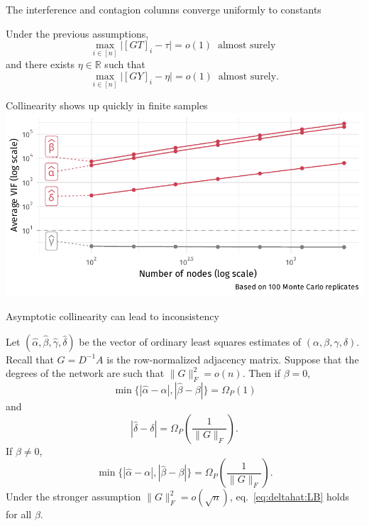 \documentclass[aspectratio=169]{beamer}
\newcommand{\alphahat}{\hat{\alpha}}
\newcommand{\deltahat}{\hat{\delta}}
\newcommand \Omegap [1] {\Omega_P \left(#1\right)}
\newcommand{\gammahat}{\hat{\gamma}}
\newcommand \betahat {\widehat{\beta}}
\newcommand{\R}{\mathbb{R}}
\theoremstyle{remark}
\begin{document}
\begin{frame}{The interference and contagion columns converge uniformly to constants}
    
    \begin{lemma}
        Under the previous assumptions,
        \begin{equation*}
            \max_{i \in [n]} \Big| [GT]_i - \tau \Big|
            = o(1) ~ \text{ almost surely }
        \end{equation*}
        and there exists $\eta \in \R$ such that
        \begin{equation*}
            \max_{i \in [n]} \Big| [GY]_i - \eta \Big|
            = o(1) ~ \text{ almost surely.}
        \end{equation*}
    \end{lemma}
\end{frame}

\begin{frame}{Collinearity shows up quickly in finite samples}
    \vspace{3mm}
    \centering
    \includegraphics{./figures/simulations/defense-vif.pdf}
\end{frame}

\begin{frame}{Asymptotic collinearity can lead to inconsistency}
    \begin{theorem}
        Let $(\alphahat, \betahat, \gammahat, \deltahat)$ be the vector of ordinary least squares estimates of $(\alpha, \beta, \gamma, \delta)$. Recall that $G = D^{-1} A$ is the row-normalized adjacency matrix. Suppose that the degrees of the network are such that $\| G \|_F^2 = o(n)$.
        Then if $\beta = 0$,
        \begin{equation*}
            \min\{ |\alphahat-\alpha|, |\betahat-\beta| \}
            = \Omegap{ 1 }
        \end{equation*}
        and
        \begin{equation} \label{eq:deltahat:LB}
            | \deltahat - \delta | = \Omegap{ \frac{1}{\|G\|_F} }.
        \end{equation}
        If $\beta \neq 0$,
        \begin{equation*}
            \min\{ |\alphahat-\alpha|, |\betahat-\beta| \}
            = \Omegap{ \frac{1}{\|G\|_F} }.
        \end{equation*}
        Under the stronger assumption $\|G\|_F^2 = o( \sqrt{n} )$, eq.~\eqref{eq:deltahat:LB} holds for all $\beta$.
    \end{theorem}
\end{frame}
\end{document}
